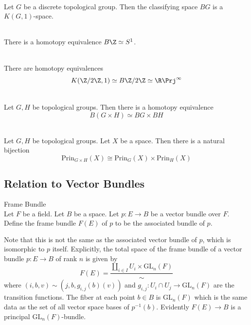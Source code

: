 \documentclass[a4paper]{article}
\begin{document}
\begin{crl}{}{}\\
Let $G$ be a discrete topological group. Then the classifying space $BG$ is a $K(G,1)$-space. 
\end{crl}

\begin{eg}{}{}\\
There is a homotopy equivalence $B\Z\simeq S^1$. 
\end{eg}

\begin{eg}{}{}\\
There are homotopy equivalences $$K(\Z/2\Z,1)\simeq B\Z/2\Z\simeq\R\Prj^\infty$$
\end{eg}

\begin{prp}{}{}\\
Let $G,H$ be topological groups. Then there is a homotopy equivalence $$B(G\times H)\simeq BG\times BH$$
\end{prp}

\begin{crl}{}{}\\
Let $G,H$ be topological groups. Let $X$ be a space. Then there is a natural bijection $$\text{Prin}_{G\times H}(X)\cong\text{Prin}_G(X)\times\text{Prin}_H(X)$$
\end{crl}

\subsection{Relation to Vector Bundles}
\begin{defn}{Frame Bundle}{}\\
Let $F$ be a field. Let $B$ be a space. Let $p:E\to B$ be a vector bundle over $F$. Define the frame bundle $F(E)$ of $p$ to be the associated bundle of $p$. 
\end{defn}

Note that this is not the same as the associated vector bundle of $p$, which is isomorphic to $p$ itself. Explicitly, the total space of the frame bundle of a vector bundle $p:E\to B$ of rank $n$ is given by $$F(E)=\frac{\coprod_{i\in I}U_i\times\text{GL}_n(F)}{\sim}$$ where $(i,b,v)\sim(j,b,g_{i,j}(b)(v))$ and $g_{i,j}:U_i\cap U_j\to\text{GL}_n(F)$ are the transition functions. The fiber at each point $b\in B$ is $\text{GL}_n(F)$ which is the same data as the set of all vector space bases of $p^{-1}(b)$. Evidently $F(E)\to B$ is a principal $\text{GL}_n(F)$-bundle. 
\end{document}
